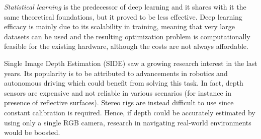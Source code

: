 \textit{Statistical learning} is the predecessor of deep learning and it shares with it the same theoretical foundations, but it proved to be less effective.
Deep learning efficacy is mainly due to its scalability in training, meaning that very large datasets can be used and the resulting optimization problem is computationally feasible for the existing hardware, although the costs are not always affordable.

%
%
%

Single Image Depth Estimation (SIDE) saw a growing research interest in the last years.
Its popularity is to be attributed to advancements in robotics and autonomous driving which could benefit from solving this task.
In fact, depth sensors are expensive and not reliable in various scenarios (for instance in presence of reflective surfaces).
Stereo rigs are instead difficult to use since constant calibration is required.
Hence, if depth could be accurately estimated by using only a single RGB camera, research in navigating real-world environments would be boosted.

